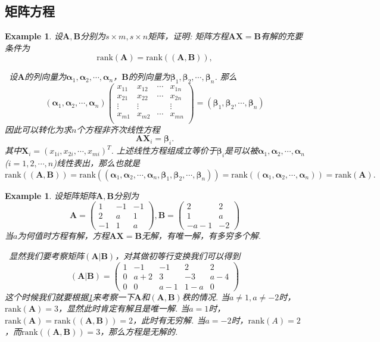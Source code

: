 \documentclass{article}
\newtheorem{example}[theorem]{Example}
\newcommand{\hints}{{\color{blue} \text{hints}}}
\newcommand{\mbf}[1]{\bm{#1}}
\newcommand{\rank}[1]{\text{rank}\left(#1\right)} %
\begin{document}
\subsection{矩阵方程}

\begin{example}\label{matrix-equation-1}
\rm 设$\mbf{A},\mbf{B}$分别为$s \times m,s \times n$矩阵，证明: 矩阵方程$\mbf{A}\mbf{X} = \mbf{B}$有解的充要条件为
$$
\rank{\mbf{A}} = \rank{(\mbf{A},\mbf{B})},
$$

\hints\ 设$\mbf{A}$的列向量为$\mbf{\alpha}_1,\mbf{\alpha}_2,\cdots,\mbf{\alpha}_n$，$\mbf{B}$的列向量为$\mbf{\beta}_1,\mbf{\beta}_2,\cdots,\mbf{\beta}_n$. 那么
$$
(\mbf{\alpha}_1,\mbf{\alpha}_2,\cdots,\mbf{\alpha}_n)\begin{pmatrix}
x_{11} & x_{12} & \cdots & x_{1n} \\
x_{21} & x_{22} & \cdots & x_{2n} \\
\vdots & \vdots &  & \vdots \\
x_{m1} & x_{m2} & \cdots & x_{mn} \\
\end{pmatrix} = (\mbf{\beta}_1,\mbf{\beta}_2,\cdots,\mbf{\beta}_n)
$$
因此可以转化为求$n$个方程非齐次线性方程
$$
\mbf{A} \mbf{X}_i = \mbf{\beta}_i.  
$$
其中$\mbf{X}_i = (x_{1i},x_{2i},\cdots,x_{mi})^T$. 上述线性方程组成立等价于$\mbf{\beta}_{i}$是可以被$\mbf{\alpha}_1,\mbf{\alpha}_2,\cdots,\mbf{\alpha}_n$($i=1,2,\cdots,n$)线性表出，那么也就是
$$
\rank{(\mbf{A},\mbf{B})} = \rank{(\mbf{\alpha}_1,\mbf{\alpha}_2,\cdots,\mbf{\alpha}_n,\mbf{\beta}_1,\mbf{\beta}_2,\cdots,\mbf{\beta}_n)} = \rank{(\mbf{\alpha}_1,\mbf{\alpha}_2,\cdots,\mbf{\alpha}_n)} = \rank{\mbf{A}}.
$$
\end{example}

\begin{example}
\rm 设矩阵矩阵$\mbf{A},\mbf{B}$分别为
$$
\mbf{A} = \begin{pmatrix}
1 & -1 & -1 \\
2 & a & 1 \\
-1 & 1 & a 
\end{pmatrix},
\mbf{B} = \begin{pmatrix}
2 & 2 \\
1 & a \\
-a-1 & -2 
\end{pmatrix}
$$
当$a$为何值时方程有解，方程$\mbf{AX} = \mbf{B}$无解，有唯一解，有多穷多个解. 

\hints\ 显然我们要考察矩阵$(\mbf{A} | \mbf{B})$，对其做初等行变换我们可以得到
$$
(\mbf{A} | \mbf{B}) = \left(\begin{array}{ccc|cc}
1 & -1 & -1 & 2 & 2 \\
0 & a+2 & 3 & -3 & a-4 \\
0 & 0 & a-1 & 1-a & 0
\end{array}\right)
$$
这个时候我们就要根据\ref{matrix-equation-1}来考察一下$\mbf{A}$和$(\mbf{A},\mbf{B})$秩的情况. 当$a \neq 1, a \neq -2$时，$\rank{\mbf{A}} = 3$，显然此时肯定有解且是唯一解. 当$a = 1$时，$\rank{\mbf{A}} = \rank{(\mbf{A},\mbf{B})} = 2$，此时有无穷解. 当$a = -2$时，$\rank{A} = 2$，而$\rank{(\mbf{A},\mbf{B})}=3$，那么方程是无解的. 
\end{example}
\end{document}
